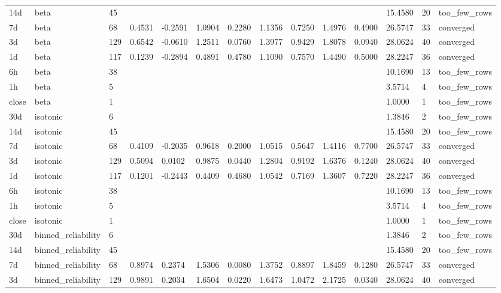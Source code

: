 \begin{tabular}{llllllllllllll}
14d & beta & 45 &  &  &  &  &  &  &  &  & 15.4580 & 20 & too\_few\_rows \\
7d & beta & 68 & 0.4531 & -0.2591 & 1.0904 & 0.2280 & 1.1356 & 0.7250 & 1.4976 & 0.4900 & 26.5747 & 33 & converged \\
3d & beta & 129 & 0.6542 & -0.0610 & 1.2511 & 0.0760 & 1.3977 & 0.9429 & 1.8078 & 0.0940 & 28.0624 & 40 & converged \\
1d & beta & 117 & 0.1239 & -0.2894 & 0.4891 & 0.4780 & 1.1090 & 0.7570 & 1.4490 & 0.5000 & 28.2247 & 36 & converged \\
6h & beta & 38 &  &  &  &  &  &  &  &  & 10.1690 & 13 & too\_few\_rows \\
1h & beta & 5 &  &  &  &  &  &  &  &  & 3.5714 & 4 & too\_few\_rows \\
close & beta & 1 &  &  &  &  &  &  &  &  & 1.0000 & 1 & too\_few\_rows \\
30d & isotonic & 6 &  &  &  &  &  &  &  &  & 1.3846 & 2 & too\_few\_rows \\
14d & isotonic & 45 &  &  &  &  &  &  &  &  & 15.4580 & 20 & too\_few\_rows \\
7d & isotonic & 68 & 0.4109 & -0.2035 & 0.9618 & 0.2000 & 1.0515 & 0.5647 & 1.4116 & 0.7700 & 26.5747 & 33 & converged \\
3d & isotonic & 129 & 0.5094 & 0.0102 & 0.9875 & 0.0440 & 1.2804 & 0.9192 & 1.6376 & 0.1240 & 28.0624 & 40 & converged \\
1d & isotonic & 117 & 0.1201 & -0.2443 & 0.4409 & 0.4680 & 1.0542 & 0.7169 & 1.3607 & 0.7220 & 28.2247 & 36 & converged \\
6h & isotonic & 38 &  &  &  &  &  &  &  &  & 10.1690 & 13 & too\_few\_rows \\
1h & isotonic & 5 &  &  &  &  &  &  &  &  & 3.5714 & 4 & too\_few\_rows \\
close & isotonic & 1 &  &  &  &  &  &  &  &  & 1.0000 & 1 & too\_few\_rows \\
30d & binned\_reliability & 6 &  &  &  &  &  &  &  &  & 1.3846 & 2 & too\_few\_rows \\
14d & binned\_reliability & 45 &  &  &  &  &  &  &  &  & 15.4580 & 20 & too\_few\_rows \\
7d & binned\_reliability & 68 & 0.8974 & 0.2374 & 1.5306 & 0.0080 & 1.3752 & 0.8897 & 1.8459 & 0.1280 & 26.5747 & 33 & converged \\
3d & binned\_reliability & 129 & 0.9891 & 0.2034 & 1.6504 & 0.0220 & 1.6473 & 1.0472 & 2.1725 & 0.0340 & 28.0624 & 40 & converged \\

\end{tabular}
